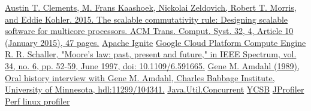 \documentclass[conference]{IEEEtran}
\begin{document}
\pagebreak
\begin{thebibliography}{00}
 \href{https://dl.acm.org/doi/10.1145/2699681}{Austin T. Clements, M. Frans Kaashoek, Nickolai Zeldovich, Robert T. Morris, and Eddie Kohler. 2015. The scalable commutativity rule: Designing scalable software for multicore processors. ACM Trans. Comput. Syst. 32, 4, Article 10 (January 2015), 47 pages.}
 \href{https://ignite.apache.org/docs/latest/}{Apache Ignite}
 \href{https://cloud.google.com/compute/docs}{Google Cloud Platform Compute Engine}
 \href{https://ieeexplore.ieee.org/document/591665}{R. R. Schaller, "Moore's law: past, present and future," in IEEE Spectrum, vol. 34, no. 6, pp. 52-59, June 1997, doi: 10.1109/6.591665.}
 \href{https://conservancy.umn.edu/handle/11299/104341}{Gene M. Amdahl (1989), Oral history interview with Gene M. Amdahl, Charles Babbage Institute, University of Minnesota, hdl:11299/104341.}
 \href{https://docs.oracle.com/javase/8/docs/api/index.html?java/util/concurrent/package-summary.html}{Java.Util.Concurrent}
 \href{https://ycsb.site}{YCSB}
 \href{https://www.ej-technologies.com/products/jprofiler/overview.html}{JProfiler}
 \href{https://perf.wiki.kernel.org/index.php/Main_Page}{Perf linux profiler}
\end{thebibliography}

\vspace{12pt}
\end{document}

